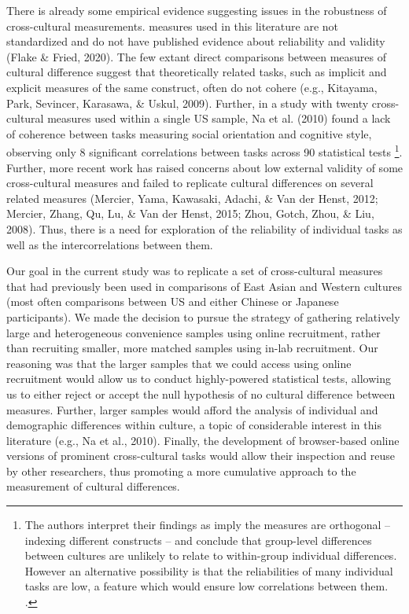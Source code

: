 \documentclass[
  man]{apa6}
\begin{document}
There is already some empirical evidence suggesting issues in the robustness of cross-cultural measurements. measures used in this literature are not standardized and do not have published evidence about reliability and validity (Flake \& Fried, 2020). The few extant direct comparisons between measures of cultural difference suggest that theoretically related tasks, such as implicit and explicit measures of the same construct, often do not cohere (e.g., Kitayama, Park, Sevincer, Karasawa, \& Uskul, 2009). Further, in a study with twenty cross-cultural measures used within a single US sample, Na et al. (2010) found a lack of coherence between tasks measuring social orientation and cognitive style, observing only 8 significant correlations between tasks across 90 statistical tests \footnote{ The authors interpret their findings as imply the measures are orthogonal -- indexing different constructs -- and conclude that group-level differences between cultures are unlikely to relate to within-group individual differences. However an alternative possibility is that the reliabilities of many individual tasks are low, a feature which would ensure low correlations between them.
  .}. Further, more recent work has raised concerns about low external validity of some cross-cultural measures and failed to replicate cultural differences on several related measures (Mercier, Yama, Kawasaki, Adachi, \& Van der Henst, 2012; Mercier, Zhang, Qu, Lu, \& Van der Henst, 2015; Zhou, Gotch, Zhou, \& Liu, 2008). Thus, there is a need for exploration of the reliability of individual tasks as well as the intercorrelations between them.

Our goal in the current study was to replicate a set of cross-cultural measures that had previously been used in comparisons of East Asian and Western cultures (most often comparisons between US and either Chinese or Japanese participants). We made the decision to pursue the strategy of gathering relatively large and heterogeneous convenience samples using online recruitment, rather than recruiting smaller, more matched samples using in-lab recruitment. Our reasoning was that the larger samples that we could access using online recruitment would allow us to conduct highly-powered statistical tests, allowing us to either reject or accept the null hypothesis of no cultural difference between measures. Further, larger samples would afford the analysis of individual and demographic differences within culture, a topic of considerable interest in this literature (e.g., Na et al., 2010). Finally, the development of browser-based online versions of prominent cross-cultural tasks would allow their inspection and reuse by other researchers, thus promoting a more cumulative approach to the measurement of cultural differences.
\end{document}
